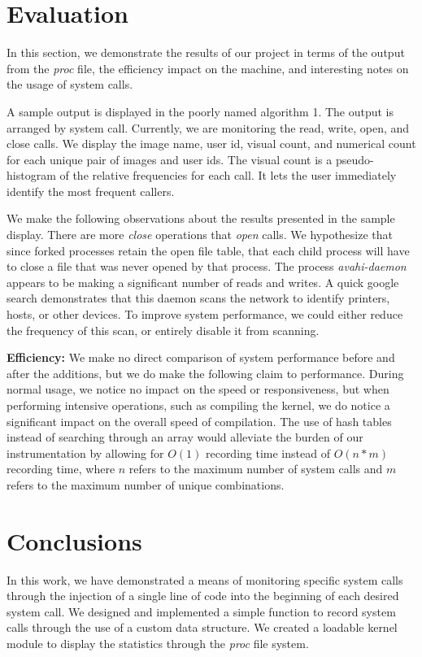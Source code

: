 \documentclass[conference]{IEEEtran}
\begin{document}
\section{Evaluation}
\label{sec:evaluation}
In this section, we demonstrate the results of our project in terms of the output from the \textit{proc} file, the efficiency impact on the machine, and interesting notes on the usage of system calls.

A sample output is displayed in the poorly named algorithm 1.
The output is arranged by system call.  Currently, we are monitoring the read, write, open, and close calls.
We display the image name, user id, visual count, and numerical count for each unique pair of images and user ids.
The visual count is a pseudo-histogram of the relative frequencies for each call.
It lets the user immediately identify the most frequent callers.

We make the following observations about the results presented in the sample display.
There are more \textit{close} operations that \textit{open} calls.
We hypothesize that since forked processes retain the open file table, that each child process will have to close a file that was never opened by that process.
The process \textit{avahi-daemon} appears to be making a significant number of reads and writes.
A quick google search demonstrates that this daemon scans the network to identify printers, hosts, or other devices.
To improve system performance, we could either reduce the frequency of this scan, or entirely disable it from scanning.

\textbf{Efficiency:} We make no direct comparison of system performance before and after the additions, but we do make the following claim to performance.
During normal usage, we notice no impact on the speed or responsiveness, but when performing intensive operations, such as compiling the kernel, we do notice a significant impact on the overall speed of compilation.
The use of hash tables instead of searching through an array would alleviate the burden of our instrumentation by allowing for $O(1)$ recording time instead of $O(n*m)$ recording time, where $n$ refers to the maximum number of system calls and $m$ refers to the maximum number of unique combinations.

\section{Conclusions}
\label{sec:conclusions}
In this work, we have demonstrated a means of monitoring specific system calls through the injection of a single line of code into the beginning of each desired system call.
We designed and implemented a simple function to record system calls through the use of a custom data structure.
We created a loadable kernel module to display the statistics through the \textit{proc} file system.
\end{document}
